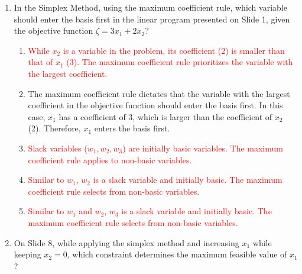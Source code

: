 \documentclass{article}%
\newcommand{\incorrect}[1]{\textcolor{red}{#1}}
\begin{document}
\begin{enumerate}
\begin{enumerate}
\item The minimum ratio test is used to determine the leaving variable from the basis. It ensures that after the pivot operation, all variables remain non-negative, thus maintaining feasibility.%
\item \incorrect{The minimum ratio test is a crucial step in the simplex method to guarantee feasibility.}%
\item \incorrect{The minimum ratio test doesn't directly address degeneracy, although degeneracy can affect the choice of the leaving variable.}%
\item \incorrect{Unboundedness is detected when there is no positive ratio in the minimum ratio test, indicating that a variable can be increased indefinitely without violating constraints.}%
\end{enumerate}%
\vspace{1em}%
\item In the Simplex Method, using the maximum coefficient rule, which variable should enter the basis first in the linear program presented on Slide 1, given the objective function $\zeta = 3x_1 + 2x_2$?%
\begin{enumerate}%
\item \incorrect{While $x_2$ is a variable in the problem, its coefficient (2) is smaller than that of $x_1$ (3). The maximum coefficient rule prioritizes the variable with the largest coefficient.}%
\item The maximum coefficient rule dictates that the variable with the largest coefficient in the objective function should enter the basis first. In this case, $x_1$ has a coefficient of 3, which is larger than the coefficient of $x_2$ (2). Therefore, $x_1$ enters the basis first.%
\item \incorrect{Slack variables ($w_1, w_2, w_3$) are initially basic variables.  The maximum coefficient rule applies to non-basic variables.}%
\item \incorrect{Similar to $w_1$, $w_2$ is a slack variable and initially basic. The maximum coefficient rule selects from non-basic variables.}%
\item \incorrect{Similar to $w_1$ and $w_2$, $w_3$ is a slack variable and initially basic. The maximum coefficient rule selects from non-basic variables.}%
\end{enumerate}%
\vspace{1em}%
\item On Slide 8, while applying the simplex method and increasing $x_1$ while keeping $x_2 = 0$, which constraint determines the maximum feasible value of $x_1$?%

\end{enumerate}
\end{document}
